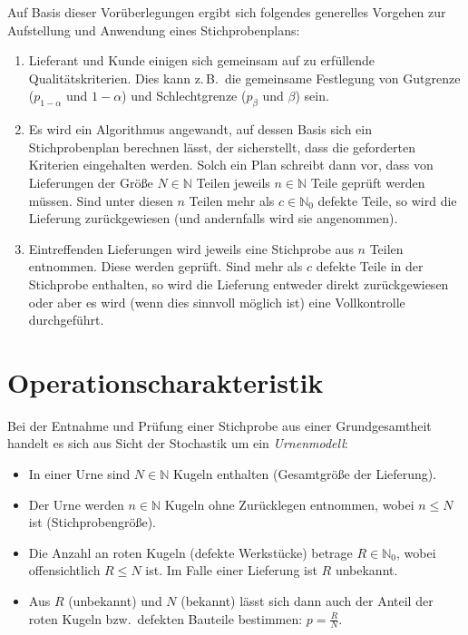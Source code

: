 \documentclass[a4paper,11pt,oneside]{article}
\begin{document}
Auf Basis dieser Vorüberlegungen ergibt sich folgendes generelles Vorgehen zur Aufstellung und Anwendung eines Stichprobenplans:

\begin{enumerate}
\item
Lieferant und Kunde einigen sich gemeinsam auf zu erfüllende Qualitätskriterien. Dies kann z.\,B.\ die gemeinsame Festlegung von Gutgrenze ($p_{1-\alpha}$ und $1-\alpha$) und Schlechtgrenze ($p_\beta$ und $\beta$) sein.
\item
Es wird ein Algorithmus angewandt, auf dessen Basis sich ein Stichprobenplan berechnen lässt, der sicherstellt, dass die geforderten Kriterien eingehalten werden. Solch ein Plan schreibt dann vor, dass von Lieferungen der Größe $N\in\mathbb N$ Teilen jeweils $n\in\mathbb N$ Teile geprüft werden müssen. Sind unter diesen $n$ Teilen mehr als $c\in\mathbb N_0$ defekte Teile, so wird die Lieferung zurückgewiesen (und andernfalls wird sie angenommen).
\item
Eintreffenden Lieferungen wird jeweils eine Stichprobe aus $n$ Teilen entnommen. Diese werden geprüft. Sind mehr als $c$ defekte Teile in der Stichprobe enthalten, so wird die Lieferung entweder direkt zurückgewiesen oder aber es wird (wenn dies sinnvoll möglich ist) eine Vollkontrolle durchgeführt.
\end{enumerate}



\section{Operationscharakteristik}

Bei der Entnahme und Prüfung einer Stichprobe aus einer Grundgesamtheit handelt es sich aus Sicht der Stochastik um ein \emph{Urnenmodell}:

\begin{itemize}
\item
In einer Urne sind $N\in\mathbb N$ Kugeln enthalten (Gesamtgröße der Lieferung).
\item
Der Urne werden $n\in\mathbb N$ Kugeln ohne Zurücklegen entnommen, wobei $n\le N$ ist (Stichprobengröße).
\item
Die Anzahl an roten Kugeln (defekte Werkstücke) betrage $R\in\mathbb N_0$, wobei offensichtlich $R\le N$ ist. Im Falle einer Lieferung ist $R$ unbekannt.
\item
Aus $R$ (unbekannt) und $N$ (bekannt) lässt sich dann auch der Anteil der roten Kugeln bzw.\ defekten Bauteile bestimmen: $p=\frac{R}{N}$.
\end{itemize}
\end{document}
